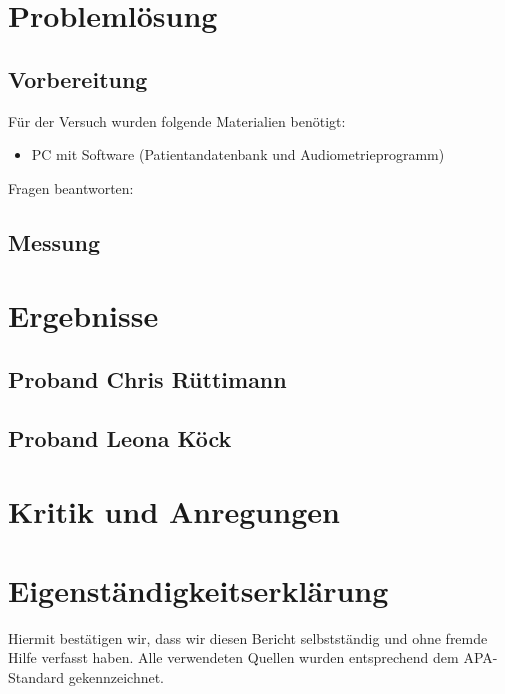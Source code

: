 \documentclass[11pt]{scrartcl}
\begin{document}
    \section{Problemlösung}

    \subsection{Vorbereitung}
   

    Für der Versuch wurden folgende Materialien benötigt:

    \begin{itemize}
        \item  PC mit Software (Patientandatenbank und Audiometrieprogramm)
        
    \end{itemize}
    Fragen beantworten:


    \subsection{Messung}
    
    \section{Ergebnisse}


    \subsection{Proband Chris Rüttimann}
  
    \pagebreak

    \subsection{Proband Leona Köck}

   
    \section{Kritik und Anregungen}
    \pagebreak

    \section*{Eigenständigkeitserklärung}

    Hiermit bestätigen wir, dass wir diesen Bericht selbstständig und ohne fremde Hilfe verfasst haben.
    Alle verwendeten Quellen wurden entsprechend dem APA-Standard gekennzeichnet.
    \\[3cm]
\end{document}
